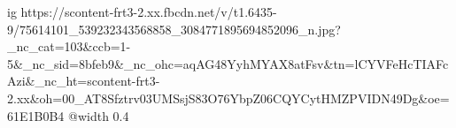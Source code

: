  
 
 
 
 

\ifcmt
  ig https://scontent-frt3-2.xx.fbcdn.net/v/t1.6435-9/75614101_539232343568858_3084771895694852096_n.jpg?_nc_cat=103&ccb=1-5&_nc_sid=8bfeb9&_nc_ohc=aqAG48YyhMYAX8atFsv&tn=lCYVFeHcTIAFcAzi&_nc_ht=scontent-frt3-2.xx&oh=00_AT8Sfztrv03UMSsjS83O76YbpZ06CQYCytHMZPVIDN49Dg&oe=61E1B0B4
  @width 0.4
\fi
